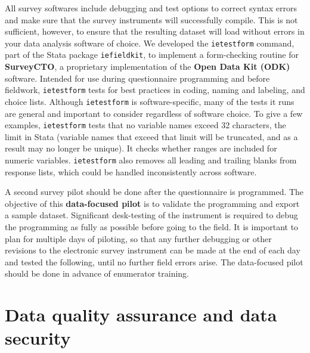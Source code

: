 All survey softwares include debugging and test options
to correct syntax errors and make sure that the survey instruments will successfully compile.
This is not sufficient, however, to ensure that the resulting dataset
will load without errors in your data analysis software of choice.
We developed the \texttt{ietestform} command,
part of the Stata package \texttt{iefieldkit},
to implement a form-checking routine for \textbf{SurveyCTO},
a proprietary implementation of the \textbf{Open Data Kit (ODK)} software.
Intended for use during questionnaire programming and before fieldwork,
\texttt{ietestform} tests for best practices in coding, naming and labeling, and choice lists.
Although \texttt{ietestform} is software-specific,
many of the tests it runs are general and important to consider regardless of software choice.
To give a few examples, \texttt{ietestform} tests that no variable names exceed
32 characters, the limit in Stata (variable names that exceed that limit will
be truncated, and as a result may no longer be unique).
It checks whether ranges are included for numeric variables.
\texttt{ietestform} also removes all leading and trailing blanks from response lists,
which could be handled inconsistently across software.

A second survey pilot should be done after the questionnaire is programmed.
The objective of this \textbf{data-focused pilot}
is to validate the programming and export a sample dataset.
Significant desk-testing of the instrument is required to debug the programming
as fully as possible before going to the field.
It is important to plan for multiple days of piloting,
so that any further debugging or other revisions to the electronic survey instrument
can be made at the end of each day and tested the following, until no further field errors arise.
The data-focused pilot should be done in advance of enumerator training.

\section{Data quality assurance and data security}


